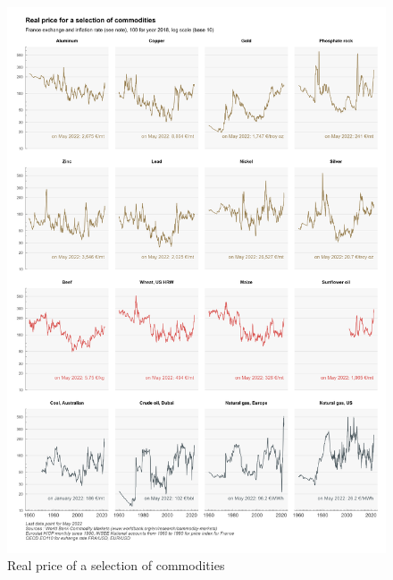 \documentclass[
  9pt,
  a4paper,
  DIV=11,
  numbers=noendperiod,
  oneside]{scrartcl}
\begin{document}
\begin{figure}

\caption{Real price of a selection of commodities}

{\centering \includegraphics[width=16cm,height=\textheight]{../svg/gcom.png}

}

\end{figure}
\end{document}
